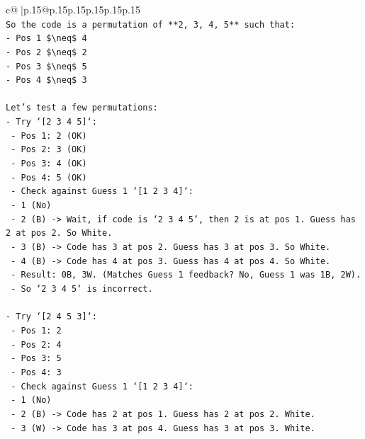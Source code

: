 \documentclass{article}
\begin{document}
{\begin{supertabular}{c@{$\;$}|p{.15\linewidth}@{}p{.15\linewidth}p{.15\linewidth}p{.15\linewidth}p{.15\linewidth}p{.15\linewidth}}
{{{\\ 
\texttt{So the code is a permutation of **2, 3, 4, 5** such that:} \\
\texttt{{-}   Pos 1 \$\textbackslash{}neq\$ 4} \\
\texttt{{-}   Pos 2 \$\textbackslash{}neq\$ 2} \\
\texttt{{-}   Pos 3 \$\textbackslash{}neq\$ 5} \\
\texttt{{-}   Pos 4 \$\textbackslash{}neq\$ 3} \\
\\ 
\texttt{Let's test a few permutations:} \\
\texttt{{-}   Try `{[}2 3 4 5{]}`:} \\
\texttt{    {-}   Pos 1: 2 (OK)} \\
\texttt{    {-}   Pos 2: 3 (OK)} \\
\texttt{    {-}   Pos 3: 4 (OK)} \\
\texttt{    {-}   Pos 4: 5 (OK)} \\
\texttt{    {-}   Check against Guess 1 `{[}1 2 3 4{]}`:} \\
\texttt{        {-}   1 (No)} \\
\texttt{        {-}   2 (B) {-}> Wait, if code is `2 3 4 5`, then 2 is at pos 1. Guess has 2 at pos 2. So White.} \\
\texttt{        {-}   3 (B) {-}> Code has 3 at pos 2. Guess has 3 at pos 3. So White.} \\
\texttt{        {-}   4 (B) {-}> Code has 4 at pos 3. Guess has 4 at pos 4. So White.} \\
\texttt{        {-}   Result: 0B, 3W. (Matches Guess 1 feedback? No, Guess 1 was 1B, 2W).} \\
\texttt{    {-}   So `2 3 4 5` is incorrect.} \\
\\ 
\texttt{{-}   Try `{[}2 4 5 3{]}`:} \\
\texttt{    {-}   Pos 1: 2} \\
\texttt{    {-}   Pos 2: 4} \\
\texttt{    {-}   Pos 3: 5} \\
\texttt{    {-}   Pos 4: 3} \\
\texttt{    {-}   Check against Guess 1 `{[}1 2 3 4{]}`:} \\
\texttt{        {-}   1 (No)} \\
\texttt{        {-}   2 (B) {-}> Code has 2 at pos 1. Guess has 2 at pos 2. White.} \\
\texttt{        {-}   3 (W) {-}> Code has 3 at pos 4. Guess has 3 at pos 3. White.} \\
}}}
\end{supertabular}}
\end{document}

